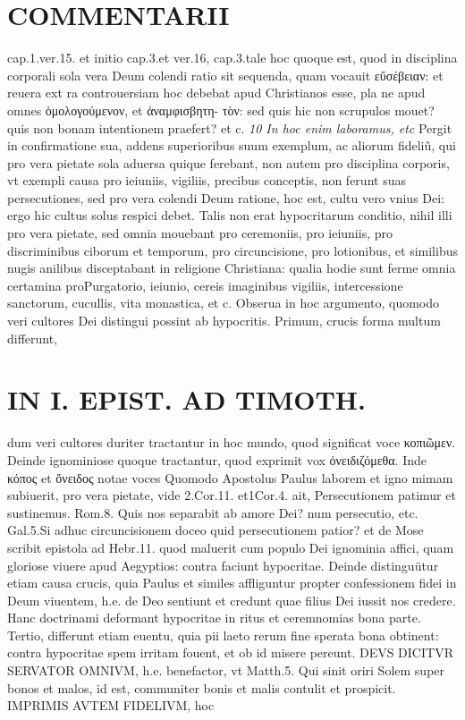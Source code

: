 \documentclass{article}
\begin{document}
\begin{pages}
\section*{COMMENTARII }
\marginpar{[ p.102 ]}\pstart cap.1.ver.15. et initio cap.3.et ver.16, cap.3.tale hoc quoque est, quod in disciplina corporali sola vera Deum colendi ratio sit sequenda, quam vocauit εὔσέβειαν: et reuera ext ra controuersiam hoc debebat apud Christianos esse, pla ne apud omnes ὁμολογούμενον, et ἀναμφισβητη- τὸν: sed quis hic non scrupulos mouet? quis non bonam intentionem praefert? et c.  \pend
\textit{10 In hoc enim laboramus, etc }\pstart Pergit in confirmatione sua, addens superioribus suum exemplum, ac aliorum fideliũ, qui pro vera pietate sola aduersa quique ferebant, non autem pro disciplina corporis, vt exempli causa pro ieiuniis, vigiliis, precibus conceptis, non ferunt suas persecutiones, sed pro vera colendi Deum ratione, hoc est, cultu vero vnius Dei: ergo hic cultus solus respici debet. Talis non erat hypocritarum conditio, nihil illi pro vera pietate, sed omnia mouebant pro ceremoniis, pro ieiuniis, pro discriminibus  ciborum et temporum, pro circuncisione, pro lotionibus, et similibus nugis anilibus disceptabant in religione Christiana: qualia hodie sunt ferme omnia certamina proPurgatorio, ieiunio, cereis imaginibus  vigiliis, intercessione sanctorum, cucullis, vita monastica, et c. Obserua in hoc argumento, quomodo veri cultores Dei distingui possint ab hypocritis. Primum, crucis forma multum differunt,  \pend
\section*{IN I. EPIST. AD TIMOTH. }
\marginpar{[ p.103 ]}\pstart dum veri cultores duriter tractantur in hoc mundo, quod significat voce κοπιῶμεν. Deinde ignominiose quoque tractantur, quod exprimit vox ὀνειδιζόμεθα. Inde κόπος et ὄνειδος notae voces  \pend\pstart Quomodo Apostolus Paulus laborem et igno mimam subiuerit, pro vera pietate, vide 2.Cor.11. et1Cor.4. ait, Persecutionem patimur et sustinemus. Rom.8. Quis nos separabit ab amore Dei? num persecutio, etc. Gal.5.Si adhuc circuncisionem doceo quid persecutionem patior? et de Mose scribit epistola ad Hebr.11. quod maluerit cum populo Dei ignominia affici, quam gloriose viuere apud Aegyptios: contra faciunt hypocritae.  \pend\pstart Deinde distinguütur etiam causa crucis, quia Paulus et similes affliguntur propter confessionem fidei in Deum viuentem, h.e. de Deo sentiunt et credunt quae filius Dei iussit nos credere. Hanc doctrinami deformant hypocritae in ritus et ceremnomias bona parte.  \pend\pstart Tertio, differunt etiam euentu, quia pii laeto rerum fine sperata bona obtinent: contra hypocritae spem irritam fouent, et ob id misere pereunt.  \pend\pstart DEVS DICITVR SERVATOR OMNIVM, h.e. benefactor, vt Matth.5. Qui sinit oriri Solem super bonos et malos, id est, communiter bonis et malis contulit et prospicit. IMPRIMIS AVTEM FIDELIVM, hoc  \pend

\end{pages}
\end{document}
